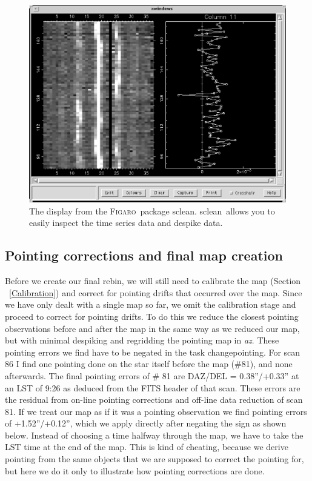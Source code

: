 \documentclass[twoside,11pt]{article}
\newcommand{\Figaro}{\xref{\textsc{Figaro}}{sun86}{}}
\newcommand{\task}[1]{\textsf{#1}}
\newcommand{\rebin}{\xref{\task{rebin}}{sun216}{REBIN}}
\newcommand{\chgpnt}{\xref{\task{change\_pointing}}{sun216}{CHANGE_POINTING}}
\newcommand{\sclean}{\xref{\task{sclean}}{sun86}{SCLEAN}}
\newcommand{\xref}[3]{#1}
\newcommand{\xlabel}[1]{}
\renewcommand{\_}{\texttt{\symbol{95}}}
\begin{document}
\begin{figure}
\begin{center}
\includegraphics[width=6in]{sc11_fig6.eps}
\caption{The display from the \Figaro\ package \sclean. \sclean\ allows
you to easily inspect the time series data and despike data. }
\label{fig:clean}
\end{center}
\end{figure}



\subsection{\xlabel{Pointing}Pointing corrections and final map 
creation}

Before we create our final \rebin, we will still need to calibrate the
map (Section \ \ref{Calibration}) and correct for pointing drifts that
occurred over the map. Since we have only dealt with a single map so
far, we omit the calibration stage and proceed to correct for pointing
drifts. To do this we reduce the closest pointing observations before
and after the map in the same way as we reduced our map, but with
minimal despiking and regridding the pointing map in {\it az}.  These
pointing errors we find have to be negated in the task \chgpnt. For
scan 86 I find one pointing done on the star itself before the map
(\#81), and none afterwards. The final pointing errors of \# 81 are
DAZ/DEL = 0.38''/+0.33'' at an LST of 9:26 as deduced from the FITS
header of that scan. These errors are the residual from on-line
pointing corrections and off-line data reduction of scan 81. If we
treat our map as if it was a pointing observation we find pointing
errors of +1.52''/+0.12'', which we apply directly after negating the
sign as shown below. Instead of choosing a time halfway through the
map, we have to take the LST time at the end of the map.  This is kind
of cheating, because we derive pointing from the same objects that we
are supposed to correct the pointing for, but here we do it only to
illustrate how pointing corrections are done.
\end{document}
